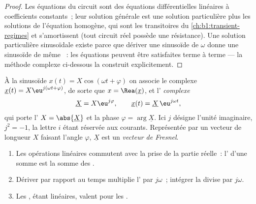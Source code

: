\begin{proof}
Les équations du circuit sont des équations différentielles linéaires à
coefficients constants~; leur solution générale est une solution
particulière plus les solutions de l'équation homogène, qui sont les
transitoires du \cref{ch:b1:transient-regimes} et s'amortissent (tout
circuit réel possède une résistance). Une solution particulière
sinusoïdale existe parce que dériver une sinusoïde de  $\omega$
donne une sinusoïde de même ~: les équations peuvent être
satisfaites terme à terme --- la méthode complexe ci-dessous la
construit explicitement.
\end{proof}

\begin{definition}\label{def:b1:sinusoidal-impedance:complex}
À la sinusoïde $x(t) = X\cos(\omega t + \varphi)$ on associe le 
complexe $\underline{x}(t) = X\eu^{j(\omega t + \varphi)}$, de sorte que
$x = \Rea(\underline{x})$, et l'\emph{ complexe}
\[
\underline{X} = X\eu^{j\varphi}, \qquad \underline{x}(t) = \underline{X}\,\eu^{j\omega t},
\]
qui porte l' $X = \abs{\underline{X}}$ et la phase
$\varphi = \arg\underline{X}$. Ici $j$ désigne l'unité imaginaire,
$j^2 = -1$, la lettre $i$ étant réservée aux courants. Représentée par
un vecteur de longueur $X$ faisant l'angle $\varphi$, $\underline{X}$
est un \emph{vecteur de Fresnel}.
\end{definition}

\begin{proposition}\label{prop:b1:sinusoidal-impedance:rules}
\begin{enumerate}
  \item Les opérations linéaires commutent avec la prise de la partie
        réelle~: l' d'une somme est la somme des
        .
  \item Dériver par rapport au temps multiplie l' par
        $j\omega$~; intégrer la divise par $j\omega$.
  \item Les , étant linéaires, valent pour les
        .
\end{enumerate}
\end{proposition}

